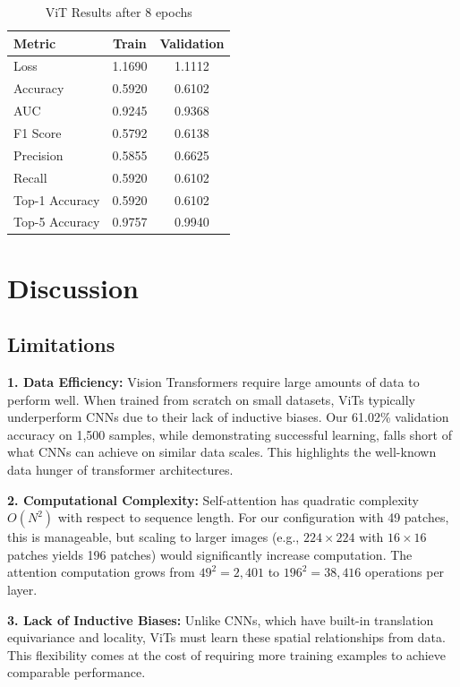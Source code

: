 \documentclass{article}
\begin{document}
\begin{table}[H]
\centering
\caption{ViT Results after 8 epochs}
\label{tab:results}
\begin{tabular}{lcc}
\toprule
\textbf{Metric} & \textbf{Train} & \textbf{Validation} \\
\midrule
Loss & 1.1690 & 1.1112 \\
Accuracy & 0.5920 & 0.6102 \\
AUC & 0.9245 & 0.9368 \\
F1 Score & 0.5792 & 0.6138 \\
Precision & 0.5855 & 0.6625 \\
Recall & 0.5920 & 0.6102 \\
Top-1 Accuracy & 0.5920 & 0.6102 \\
Top-5 Accuracy & 0.9757 & 0.9940 \\
\bottomrule
\end{tabular}
\end{table}

\section{Discussion}

\subsection{Limitations}

\textbf{1. Data Efficiency:} Vision Transformers require large amounts of data to perform well. When trained from scratch on small datasets, ViTs typically underperform CNNs due to their lack of inductive biases. Our 61.02\% validation accuracy on 1,500 samples, while demonstrating successful learning, falls short of what CNNs can achieve on similar data scales. This highlights the well-known data hunger of transformer architectures.

\textbf{2. Computational Complexity:} Self-attention has quadratic complexity $O(N^2)$ with respect to sequence length. For our configuration with 49 patches, this is manageable, but scaling to larger images (e.g., $224 \times 224$ with $16 \times 16$ patches yields 196 patches) would significantly increase computation. The attention computation grows from $49^2 = 2,401$ to $196^2 = 38,416$ operations per layer.

\textbf{3. Lack of Inductive Biases:} Unlike CNNs, which have built-in translation equivariance and locality, ViTs must learn these spatial relationships from data. This flexibility comes at the cost of requiring more training examples to achieve comparable performance.
\end{document}
